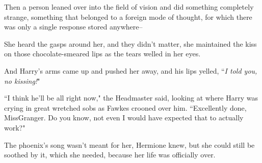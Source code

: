 Then a person leaned over into the field of vision and did something completely strange, something that belonged to a foreign mode of thought, for which there was only a single response stored anywhere\---

\later

She heard the gasps around her, and they didn't matter, she maintained the kiss on those chocolate-smeared lips as the tears welled in her eyes.

And Harry's arms came up and pushed her away, and his lips yelled, ``\emph{I told you, no kissing!}"

\later

``I think he'll be all right now," the Headmaster said, looking at where Harry was crying in great wretched sobs as Fawkes crooned over him. ``Excellently done, Miss\?Granger. Do you know, not even I would have expected that to actually work?"

The phoenix's song wasn't meant for her, Hermione knew, but she could still be soothed by it, which she needed, because her life was officially over.

